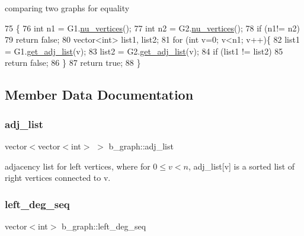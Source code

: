 comparing two graphs for equality 


\begin{DoxyCode}
75 \{
76   \textcolor{keywordtype}{int} n1 = G1.\hyperlink{classb__graph_a69ff77c254af827afbfe52934b6736a5}{nu\_vertices}();
77   \textcolor{keywordtype}{int} n2 = G2.\hyperlink{classb__graph_a69ff77c254af827afbfe52934b6736a5}{nu\_vertices}();
78   \textcolor{keywordflow}{if} (n1!= n2)
79     \textcolor{keywordflow}{return} \textcolor{keyword}{false};
80   vector<int> list1, list2;
81   \textcolor{keywordflow}{for} (\textcolor{keywordtype}{int} v=0; v<n1; v++)\{
82     list1 = G1.\hyperlink{classb__graph_aa81c7179b9c6cb4986c4b41e84a85799}{get\_adj\_list}(v);
83     list2 = G2.\hyperlink{classb__graph_aa81c7179b9c6cb4986c4b41e84a85799}{get\_adj\_list}(v);
84     \textcolor{keywordflow}{if} (list1 != list2)
85       \textcolor{keywordflow}{return} \textcolor{keyword}{false};
86   \}
87   \textcolor{keywordflow}{return} \textcolor{keyword}{true};
88 \}
\end{DoxyCode}


\subsection{Member Data Documentation}
\mbox{\label{classb__graph_a2a89d2e8f958270952aab2e8769b7342}} 
\subsubsection{\texorpdfstring{adj\+\_\+list}{adj\_list}}
{\footnotesize\ttfamily vector$<$vector$<$int$>$ $>$ b\+\_\+graph\+::adj\+\_\+list\hspace{0.3cm}{\ttfamily [private]}}



adjacency list for left vertices, where for $0 \leq v < n $, adj\+\_\+list\mbox{[}v\mbox{]} is a sorted list of right vertices connected to v. 

\mbox{\label{classb__graph_a311d16462dbb10c47b3a6c80a42139d9}} 
\subsubsection{\texorpdfstring{left\+\_\+deg\+\_\+seq}{left\_deg\_seq}}
{\footnotesize\ttfamily vector$<$int$>$ b\+\_\+graph\+::left\+\_\+deg\+\_\+seq\hspace{0.3cm}{\ttfamily [private]}}



